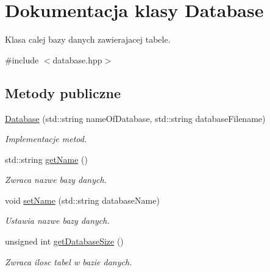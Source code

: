 \hypertarget{class_database}{}\section{Dokumentacja klasy Database}
\label{class_database}


Klasa calej bazy danych zawierajacej tabele.  




{\ttfamily \#include $<$database.\+hpp$>$}

\subsection*{Metody publiczne}
\begin{DoxyCompactItemize}
\item 
\mbox{\hyperlink{class_database_aab14cbf95cbe114d24a2884e9417a102}{Database}} (std\+::string name\+Of\+Database, std\+::string database\+Filename)
\begin{DoxyCompactList}\small\item\em Implementacje metod. \end{DoxyCompactList}\item 
\mbox{\label{class_database_a87aa575818688a5e589899bd3fa97ada}} 
std\+::string \mbox{\hyperlink{class_database_a87aa575818688a5e589899bd3fa97ada}{get\+Name}} ()
\begin{DoxyCompactList}\small\item\em Zwraca nazwe bazy danych. \end{DoxyCompactList}\item 
\mbox{\label{class_database_ae96b8e91b8119131e101555cbddb4308}} 
void \mbox{\hyperlink{class_database_ae96b8e91b8119131e101555cbddb4308}{set\+Name}} (std\+::string database\+Name)
\begin{DoxyCompactList}\small\item\em Ustawia nazwe bazy danych. \end{DoxyCompactList}\item 
\mbox{\label{class_database_ac5c3a78c9bdcd6462cd6e9e0f77d5fa7}} 
unsigned int \mbox{\hyperlink{class_database_ac5c3a78c9bdcd6462cd6e9e0f77d5fa7}{get\+Database\+Size}} ()
\begin{DoxyCompactList}\small\item\em Zwraca ilosc tabel w bazie danych. \end{DoxyCompactList}\item 

\end{DoxyCompactItemize}
